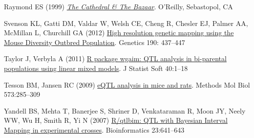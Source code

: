 \documentclass[letterpaper]{article}
\newenvironment{hanging}
{\begin{list}{}
        {\setlength{\labelwidth}{0in}
         \setlength{\leftmargin}{1em}
         \setlength{\itemindent}{-1em}
         \setlength{\parsep}{0in}
         \setlength{\itemsep}{0in}
        }
}
{\end{list}}
\begin{document}
\begin{multicols}{2}
\begin{hanging}
\item Raymond ES (1999)
  \href{http://www.catb.org/esr/writings/homesteading/cathedral-bazaar/}{\emph{The
      Cathedral \& The Bazaar}}. O'Reilly, Sebastopol, CA

\item Svenson KL, Gatti DM, Valdar W, Welsh CE, Cheng R, Chesler EJ,
  Palmer AA, McMillan L, Churchill GA (2012)
  \href{http://www.ncbi.nlm.nih.gov/pubmed/22345611}{High resolution
    genetic mapping using the Mouse Diversity Outbred
    Population}. Genetics 190: 437--447

\item Taylor J, Verbyla A (2011)
  \href{http://www.jstatsoft.org/v40/i07/}{R package wgaim: QTL
    analysis in bi-parental populations using linear mixed models}. J
  Statist Soft 40:1--18

\item Tesson BM, Jansen RC (2009)
  \href{http://www.ncbi.nlm.nih.gov/pubmed/19763934}{eQTL analysis in
    mice and rats}. Methods Mol Biol 573:285--309

\item Yandell BS, Mehta T, Banerjee S, Shriner D, Venkataraman R, Moon
  JY, Neely WW, Wu H, Smith R, Yi N (2007)
  \href{http://www.ncbi.nlm.nih.gov/pubmed/17237038}{R/qtlbim: QTL
    with Bayesian Interval Mapping in experimental
    crosses}. Bioinformatics 23:641--643


\end{hanging}

\end{multicols}
\end{document}
